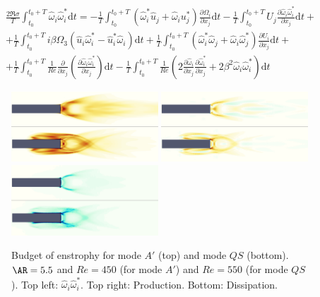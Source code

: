 \begin{equation}
  \begin{gathered}
  \frac{2 \Re{\sigma}}{T} \int_{t_0}^{t_0+T} \hat{\omega}_i \hat{\omega}_i^* \text{d}t = 
  - \frac{1}{T} \int_{t_0}^{t_0+T} \left( \hat{\omega}_i^* \hat{u}_j + \hat{\omega}_i u_j^* \right) \frac{\partial \Omega_i}{\partial x_j} \text{d}t
  - \frac{1}{T} \int_{t_0}^{t_0+T} U_j \frac{\partial \hat{\omega}_i \hat{\omega}_i^* }{\partial x_j} \text{d} t + \\
  + \frac{1}{T} \int_{t_0}^{t_0+T}    i \beta \Omega_3 \left( \hat{u}_i \hat{\omega}_{i}^* - \hat{u}_i^* \hat{\omega}_i \right)  \text{d} t
  + \frac{1}{T} \int_{t_0}^{t_0+T} \left( \hat{\omega}_i^* \hat{\omega}_j + \hat{\omega}_i \hat{\omega}_j^* \right) \frac{\partial U_i}{\partial x_j} \text{d} t + \\
  + \frac{1}{T} \int_{t_0}^{t_0+T}    \frac{1}{Re} \frac{\partial}{\partial x_j} \left( \frac{\partial \hat{\omega}_i \hat{\omega}_i^*}{\partial x_j} \right) \text{d} t -
  \frac{1}{T} \int_{t_0}^{t_0+T} \frac{1}{Re} \left( 2 \frac{\partial \hat{\omega}_i}{\partial x_j} \frac{\partial \hat{\omega}_i^*}{\partial x_j} + 2 \beta^2 \hat{\omega}_i \hat{\omega}_i^* \right) \text{d} t
  \end{gathered}
\end{equation}


\begin{figure}
  \centering
  \includegraphics[width=0.49\textwidth]{./fig/AR5s/Enst_AR5p5_Re450_Re550_beta2.png}
  \includegraphics[width=0.49\textwidth]{./fig/AR5s/ProdEnst_AR5p5_Re450_Re550_beta2.png}
  \includegraphics[width=0.49\textwidth]{./fig/AR5s/DissEnst_AR5p5_Re450_Re550_beta2.png}    
  \caption{Budget of enstrophy for mode $A'$ (top) and mode $QS$ (bottom). $\AR=5.5$ and $Re=450$ (for mode $A'$) and $Re=550$ (for mode $QS$). Top left: $\hat{\omega}_i \hat{\omega}_i^*$. Top right: Production. Bottom: Dissipation.}
  \label{fig:budget_enst}
\end{figure}  
